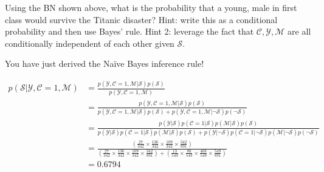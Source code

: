 \documentclass[assignment03_Solutions]{subfiles}
\begin{document}
\begin{exercise}[(45 minutes)]

\bes
\item Using the BN shown above, what is the probability that a young, male in first class would survive the Titanic disaster?  Hint: write this as a conditional probability and then use Bayes' rule.  Hint 2: leverage the fact that $\mathcal{C}, \mathcal{Y}, \mathcal{M}$ are all conditionally independent of each other given $\mathcal{S}$.

You have just derived the Na\"ive Bayes inference rule!

\begin{boxedsolution}
\begin{align}
p(\mathcal{S}|\mathcal{Y}, \mathcal{C}=1, \mathcal{M}) &= \frac{p(\mathcal{Y}, \mathcal{C}=1, \mathcal{M}|\mathcal{S})p(\mathcal{S})}{p(\mathcal{Y}, \mathcal{C}=1, \mathcal{M})} \nonumber \\
&= \frac{p(\mathcal{Y}, \mathcal{C}=1, \mathcal{M}|\mathcal{S})p(\mathcal{S})}{p(\mathcal{Y}, \mathcal{C}=1, \mathcal{M}| \mathcal{S})p(\mathcal{S}) + p(\mathcal{Y}, \mathcal{C}=1, \mathcal{M}|\neg \mathcal{S})p(\neg \mathcal{S})} \nonumber \\
&=  \frac{p(\mathcal{Y}|\mathcal{S}) p( \mathcal{C}=1 | \mathcal{S}) p(\mathcal{M}|\mathcal{S})p(\mathcal{S})}{p(\mathcal{Y}|\mathcal{S}) p( \mathcal{C}=1 | \mathcal{S}) p(\mathcal{M}|\mathcal{S})p(\mathcal{S}) + p(\mathcal{Y}|\neg \mathcal{S}) p( \mathcal{C}=1 | \neg \mathcal{S}) p(\mathcal{M}|\neg \mathcal{S})p(\neg \mathcal{S})} \nonumber \\
&= \frac{\left ( \frac{27}{342} \times \frac{136}{342} \times \frac{109}{342}\times \frac{342}{891}\right)}{\left ( \frac{27}{342} \times \frac{136}{342} \times \frac{109}{342}\times \frac{342}{891} \right ) + \left ( \frac{13}{549} \times \frac{80}{549} \times \frac{468}{549}\times \frac{549}{891} \right )} \nonumber \\
&= 0.6794 \nonumber
\end{align}

\end{boxedsolution}


\end{exercise}
\end{document}
